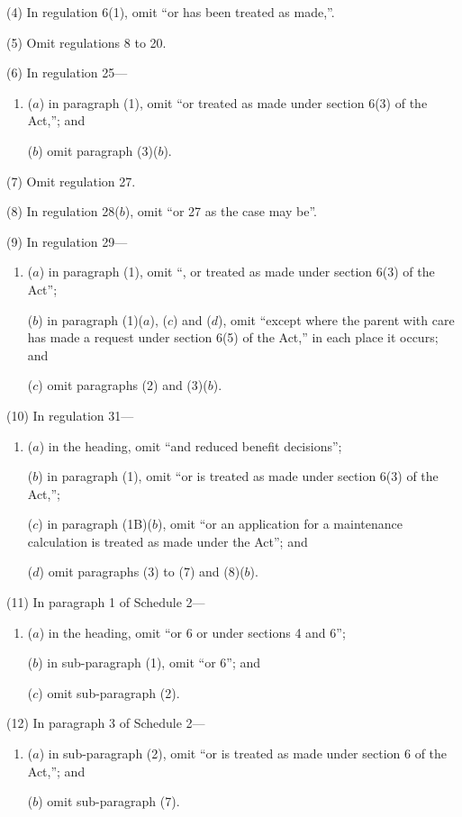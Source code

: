 \documentclass[12pt,a4paper]{article}
\begin{document}
(4) In regulation 6(1), omit “or has been treated as made,”.

(5) Omit regulations 8 to 20.

(6) In regulation 25—
\begin{enumerate}\item[]
($a$) in paragraph (1), omit “or treated as made under section 6(3) of the Act,”; and

($b$) omit paragraph (3)($b$).
\end{enumerate}

(7) Omit regulation 27.

(8) In regulation 28($b$), omit “or 27 as the case may be”.

(9) In regulation 29—
\begin{enumerate}\item[]
($a$) in paragraph (1), omit “, or treated as made under section 6(3) of the Act”;

($b$) in paragraph (1)($a$), ($c$)  and ($d$), omit “except where the parent with care has made a request under section 6(5) of the Act,” in each place it occurs; and

($c$) omit paragraphs (2) and (3)($b$).
\end{enumerate}

(10) In regulation 31—
\begin{enumerate}\item[]
($a$) in the heading, omit “and reduced benefit decisions”;

($b$) in paragraph (1), omit “or is treated as made under section 6(3) of the Act,”;

($c$) in paragraph (1B)($b$), omit “or an application for a maintenance calculation is treated as made under the Act”; and

($d$) omit paragraphs (3) to (7) and (8)($b$).
\end{enumerate}

(11) In paragraph 1 of Schedule 2—
\begin{enumerate}\item[]
($a$) in the heading, omit “or 6 or under sections 4 and 6”;

($b$) in sub-paragraph (1), omit “or 6”; and

($c$) omit sub-paragraph (2).
\end{enumerate}

(12) In paragraph 3 of Schedule 2—
\begin{enumerate}\item[]
($a$) in sub-paragraph (2), omit “or is treated as made under section 6 of the Act,”; and

($b$) omit sub-paragraph (7).
\end{enumerate}
\end{document}
